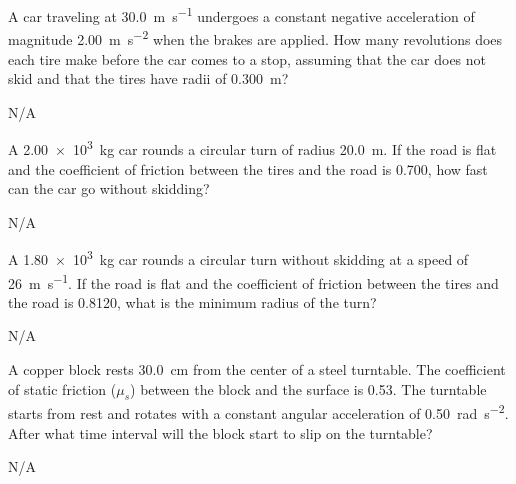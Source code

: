 



\begin{question}[ID=rotational-A-Q01,topic=rotational-motion,difficulty=A]
    A car traveling at \SI{30.0}{\meter\per\second} undergoes
        a constant negative acceleration of magnitude
        \SI{2.00}{\meter\per\second\squared} when the brakes are applied.
    How many revolutions does each tire make before the car comes to a stop,
        assuming that the car does not skid and that the tires have radii
        of \SI{0.300}{\meter}?
\end{question}
\begin{solution}
    N/A
\end{solution}


\begin{question}[ID=rotational-A-Q02,topic=rotational-motion,difficulty=A]
    A \SI{2.00e3}{\kilo\gram} car rounds a circular turn of radius \SI{20.0}{\meter}.
    If the road is flat and the coefficient of friction between the tires
        and the road is \num{0.700}, how fast can the car go without skidding?
\end{question}
\begin{solution}
    N/A
\end{solution}


\begin{question}[ID=rotational-A-Q03,topic=rotational-motion,difficulty=A]
    A \SI{1.80e3}{\kilo\gram} car rounds a circular turn without skidding
        at a speed of \SI{26}{\meter\per\second}.
    If the road is flat and the coefficient of friction between the tires
        and the road is \num{0.8120}, what is the minimum radius of the turn?
\end{question}
\begin{solution}
    N/A
\end{solution}


\begin{question}[ID=rotational-B-Q01,topic=rotational-motion,difficulty=B]
    A copper block rests \SI{30.0}{\centi\meter} from the center of a steel turntable.
    The coefficient of static friction ($\mu_s$) between the block and
        the surface is \num{0.53}.
    The turntable starts from rest and rotates with a constant angular
        acceleration of \SI{0.50}{\radian\per\second\squared}.
    After what time interval will the block start to slip on the turntable?
\end{question}
\begin{solution}
    N/A
\end{solution}


